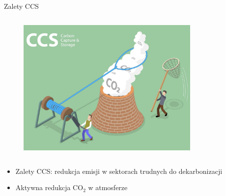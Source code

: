 \begin{columnframe}{Zalety CCS}
    \begin{column}{0.5\textwidth}
        \begin{figure}
            \centering
            \includegraphics[width=0.8\textwidth, frame]{images/CCS_illustration_gettyimages.jpg}
        \end{figure}
    \end{column}
    \begin{column}{0.5\textwidth}
        \begin{itemize}
            \item Zalety CCS: redukcja emisji w sektorach trudnych do dekarbonizacji
            \item Aktywna redukcja CO$_2$ w atmosferze
        \end{itemize}
    \end{column}
\end{columnframe}

